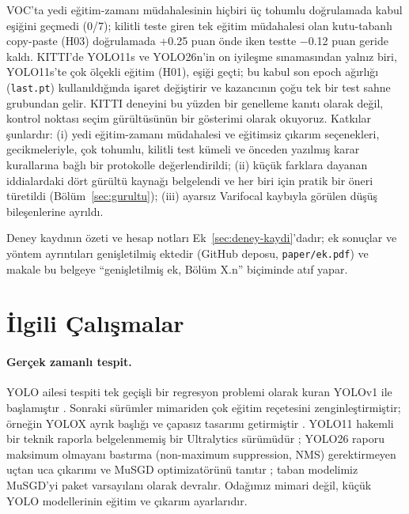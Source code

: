 \documentclass[pdflatex,iicol,sn-mathphys-num]{sn-jnl}
\begin{document}
VOC'ta yedi eğitim-zamanı müdahalesinin hiçbiri üç tohumlu doğrulamada kabul eşiğini geçmedi (0/7); kilitli teste giren tek eğitim müdahalesi olan kutu-tabanlı copy-paste (H03) doğrulamada +0.25 puan önde iken testte $-$0.12 puan geride kaldı. KITTI'de YOLO11s ve YOLO26n'in on iyileşme sınamasından yalnız biri, YOLO11s'te çok ölçekli eğitim (H01), eşiği geçti; bu kabul son epoch ağırlığı (\texttt{last.pt}) kullanıldığında işaret değiştirir ve kazancının çoğu tek bir test sahne grubundan gelir. KITTI deneyini bu yüzden bir genelleme kanıtı olarak değil, kontrol noktası seçim gürültüsünün bir gösterimi olarak okuyoruz. Katkılar şunlardır: (i) yedi eğitim-zamanı müdahalesi ve eğitimsiz çıkarım seçenekleri, gecikmeleriyle, çok tohumlu, kilitli test kümeli ve önceden yazılmış karar kurallarına bağlı bir protokolle değerlendirildi; (ii) küçük farklara dayanan iddialardaki dört gürültü kaynağı belgelendi ve her biri için pratik bir öneri türetildi (Bölüm~\ref{sec:gurultu}); (iii) ayarsız Varifocal kaybıyla görülen düşüş bileşenlerine ayrıldı.

Deney kaydının özeti ve hesap notları Ek~\ref{sec:deney-kaydi}'dadır; ek sonuçlar ve yöntem ayrıntıları genişletilmiş ektedir (GitHub deposu, \texttt{paper/ek.pdf}) ve makale bu belgeye ``genişletilmiş ek, Bölüm X.n'' biçiminde atıf yapar.

\section{İlgili Çalışmalar}\label{sec:ilgili}

\paragraph{Gerçek zamanlı tespit.}
YOLO ailesi tespiti tek geçişli bir regresyon problemi olarak kuran YOLOv1 ile başlamıştır \cite{redmon_2016_yolo}. Sonraki sürümler mimariden çok eğitim reçetesini zenginleştirmiştir; örneğin YOLOX ayrık başlığı ve çapasız tasarımı getirmiştir \cite{ge_2021_yolox}. YOLO11 hakemli bir teknik raporla belgelenmemiş bir Ultralytics sürümüdür \cite{jocher_2024_yolo11}; YOLO26 raporu maksimum olmayanı bastırma (non-maximum suppression, NMS) gerektirmeyen uçtan uca çıkarımı ve MuSGD optimizatörünü tanıtır \cite{jocher_2026_yolo26}; taban modelimiz MuSGD'yi paket varsayılanı olarak devralır. Odağımız mimari değil, küçük YOLO modellerinin eğitim ve çıkarım ayarlarıdır.
\end{document}
